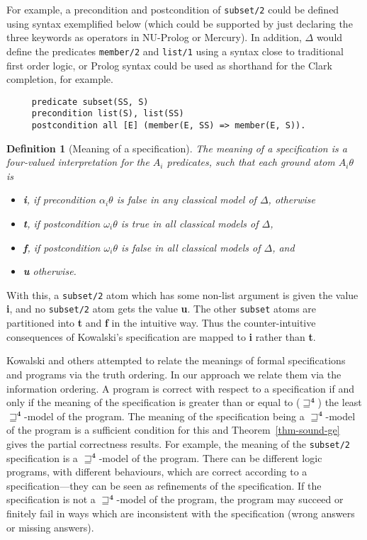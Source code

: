 \documentclass{tlp}
\newtheorem{definition}{Definition}
\newcommand{\Quad}{\ensuremath{\mathbf{4}}}
\begin{document}
For example, a precondition and postcondition of \texttt{subset/2}
could be defined using syntax exemplified below 
(which could be supported by
just declaring the three keywords as operators in NU-Prolog or Mercury).
In addition, $\Delta$ would define the predicates \texttt{member/2} and
\texttt{list/1} using a syntax close to traditional first order logic,
or Prolog syntax could be used as shorthand for the Clark completion,
for example.


\begin{verbatim}
     predicate subset(SS, S)
     precondition list(S), list(SS)
     postcondition all [E] (member(E, SS) => member(E, S)).
\end{verbatim}

\begin{definition}[Meaning of a specification]
The meaning of a specification is a four-valued interpretation for the
$A_i$ predicates, such that each ground atom $A_i \theta$ is
\begin{itemize}
\item \textbf{i}, if precondition $\alpha_i \theta$ is
false in any classical model of $\Delta$, otherwise
\item \textbf{t}, if postcondition $\omega_i \theta$ is
true in all classical models of $\Delta$,
\item \textbf{f}, if postcondition $\omega_i \theta$ is
false in all classical models of $\Delta$, and
\item \textbf{u} otherwise.
\end{itemize}	
\end{definition}
With this, a \texttt{subset/2} atom which has some non-list argument
is given the value \textbf{i}, and no \texttt{subset/2}
atom gets the value \textbf{u}. 
The other \verb!subset! atoms are partitioned into \textbf{t} and
\textbf{f} in the intuitive way.  
Thus the counter-intuitive consequences
of Kowalski's specification are mapped to
\textbf{i} rather than \textbf{t}.

Kowalski and others attempted to relate the meanings of formal
specifications and programs via the truth ordering.  In our approach
we relate them via the information ordering.  A program is correct
with respect to a specification if and only if the meaning of the
specification is greater than or equal to ($\sqsupseteq^\Quad$)
the least $\sqsupseteq^\Quad$-model of the program.  The meaning of
the specification being a $\sqsupseteq^\Quad$-model of the program
is a sufficient condition for this and Theorem\ \ref{thm-sound-ge}
gives the partial correctness results.  For example, the meaning of
the \texttt{subset/2} specification is a $\sqsupseteq^\Quad$-model of
the program.  There can be different logic programs, with different
behaviours, which are correct according to a specification---they can
be seen as refinements of the specification.
If the specification is not a $\sqsupseteq^\Quad$-model of the program,
the program may succeed or finitely fail
in ways which are inconsistent with the specification (wrong answers or
missing answers).
\end{document}
